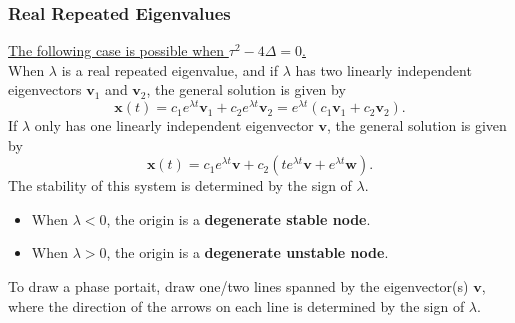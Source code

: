 \documentclass{article}
\begin{document}
\subsubsection{Real Repeated Eigenvalues}
\underline{The following case is possible when \(\tau^2 - 4\Delta = 0\).} \\[1em]
When \(\lambda\) is a real repeated eigenvalue, and
if \(\lambda\) has two linearly independent eigenvectors \(\symbf{v}_1\)
and \(\symbf{v}_2\), the general solution is given by
\begin{equation*}
    \symbf{x}\left( t \right) = c_1 e^{\lambda t} \symbf{v}_1 + c_2 e^{\lambda t} \symbf{v}_2 = e^{\lambda t} \left( c_1 \symbf{v}_1 + c_2 \symbf{v}_2 \right).
\end{equation*}
If \(\lambda\) only has one linearly independent eigenvector \(\symbf{v}\), the general solution is given by
\begin{equation*}
    \symbf{x}\left( t \right) = c_1 e^{\lambda t} \symbf{v} + c_2 \left( t e^{\lambda t} \symbf{v} + e^{\lambda t} \symbf{w} \right).
\end{equation*}
The stability of this system is determined by the sign of \(\lambda\).
\begin{itemize}
    \item When \(\lambda < 0\), the origin is a \textbf{degenerate stable node}.
    \item When \(\lambda > 0\), the origin is a \textbf{degenerate unstable node}.
\end{itemize}
To draw a phase portait, draw one/two lines spanned by the eigenvector(s) \(\symbf{v}\),
where the direction of the arrows on each line is determined by the sign of \(\lambda\).
\end{document}
